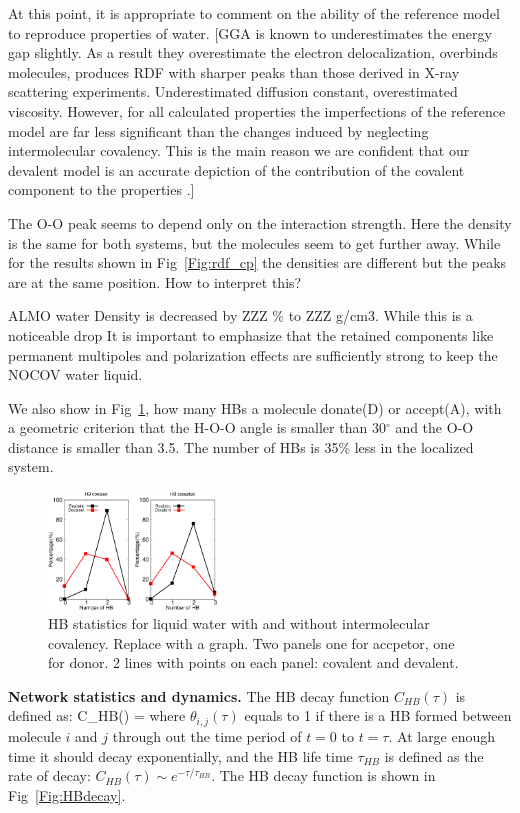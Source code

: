 \documentclass[prl,twocolumn,showpacs]{revtex4}
\begin{document}
At this point, it is appropriate to comment on the ability of the reference model to reproduce properties of water. [GGA is known to underestimates the energy gap slightly. As a result they overestimate the electron delocalization, overbinds molecules, produces RDF with sharper peaks than those derived in X-ray scattering experiments. Underestimated diffusion constant, overestimated viscosity. However, for all calculated properties the imperfections of the reference model are far less significant than the changes induced by neglecting intermolecular covalency. This is the main reason we are confident that our devalent model is an accurate depiction of the contribution of the covalent component to the properties .]

\new The O-O peak seems to depend only on the interaction strength. Here the density is the same for both systems, but the molecules seem to get further away. While for the results shown in Fig~\ref{Fig:rdf_cp} the densities are different but the peaks are at the same position. How to interpret this? \old

ALMO water Density is decreased by ZZZ \% to ZZZ g/cm3. While this is a noticeable drop It is important to emphasize that the retained components like permanent multipoles and polarization effects are sufficiently strong to keep the NOCOV water liquid. 

We also show in Fig~\ref{fig:HBstat}, how many HBs a molecule donate(D) or accept(A), with a geometric criterion that the H-O-O angle is smaller than 30$^{\circ}$ and the O-O distance is smaller than 3.5\Ang. The number of HBs is 35\% less in the localized system.

\begin{figure}
\includegraphics[width=0.4\textwidth]{new_hbstat}

\caption{HB statistics for liquid water with and without intermolecular covalency. \new Replace with a graph. Two panels one for accpetor, one for donor. 2 lines with points on each panel: covalent and devalent.\old }\label{fig:HBstat}
\end{figure}

\textbf{Network statistics and dynamics.} The HB decay function $C_{HB}(\tau)$ is defined as:
\bea
C_{HB}(\tau) =  \label{Eq:HBdecay}
\eea
where $\theta_{i,j}(\tau)$ equals to 1 if there is a HB formed between molecule $i$ and $j$ through out the time period of $t=0$ to $t=\tau$. At large enough time it should decay exponentially, and the HB life time $\tau_{HB}$ is defined as the rate of decay: $C_{HB}(\tau) \sim e^{-\tau/\tau_{HB}}$. The HB decay function is shown in Fig~\ref{Fig:HBdecay}.
\end{document}
